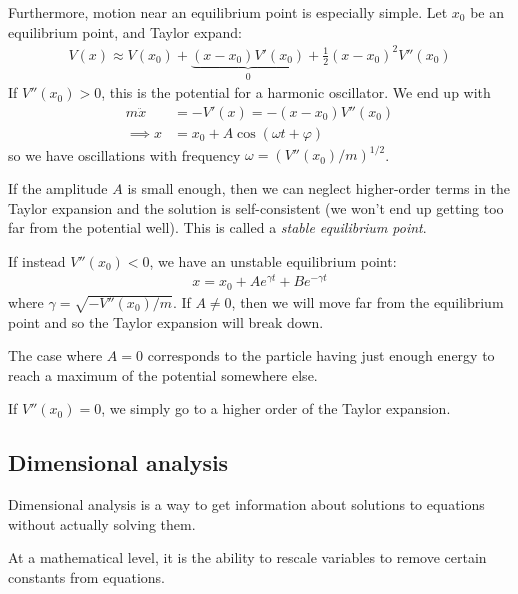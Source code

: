 \documentclass{../../template/note}
\begin{document}
    Furthermore, motion near an equilibrium point is especially simple. Let \(x_0\) be an equilibrium point, and Taylor expand:
    \begin{align*}
        V(x) \approx V(x_0) + \underbrace{(x-x_0)V'(x_0)}_0 + \frac{1}{2}(x-x_0)^2 V''(x_0)
    \end{align*}
    If \(V''(x_0) > 0\), this is the potential for a harmonic oscillator. We end up with
    \begin{align*}
        m \ddot x &= -V'(x) = -(x-x_0)V''(x_0) \\
        \implies x &= x_0 + A \cos(\omega t + \varphi)
    \end{align*}
    so we have oscillations with frequency \(\omega = (V''(x_0)/m)^{1/2}\).

    If the amplitude \(A\) is small enough, then we can neglect higher-order terms in the Taylor expansion and the solution is self-consistent (we won't end up getting too far from the potential well). This is called a \emph{stable equilibrium point}.

    If instead \(V''(x_0) < 0\), we have an unstable equilibrium point:
    \begin{align*}
        x = x_0 + Ae^{\gamma t} + Be^{-\gamma t}
    \end{align*}
    where \(\gamma = \sqrt{-V''(x_0)/m}\). If \(A \neq 0\), then we will move far from the equilibrium point and so the Taylor expansion will break down.

    The case where \(A=0\) corresponds to the particle having just enough energy to reach a maximum of the potential somewhere else.

    If \(V''(x_0) = 0\), we simply go to a higher order of the Taylor expansion.
    
    \subsection{Dimensional analysis}

    Dimensional analysis is a way to get information about solutions to equations without actually solving them.

    At a mathematical level, it is the ability to rescale variables to remove certain constants from equations.
\end{document}
